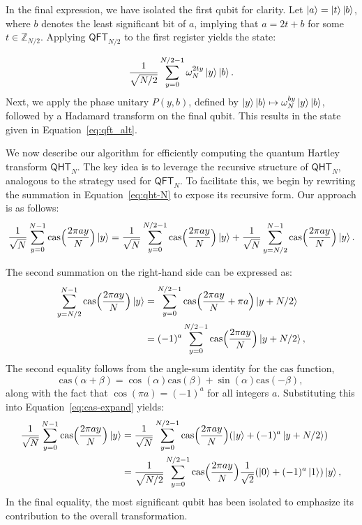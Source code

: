 \documentclass[12pt]{report}
\newcommand{\cas}{\mathrm{cas}}
\newcommand{\qht}{\mathsf{QHT}}
\newcommand{\qft}{\mathsf{QFT}}
\begin{document}
In the final expression, we have isolated the first qubit for clarity. Let \( \ket{a} = \ket{t}\ket{b} \), where \( b \) denotes the least significant bit of \( a \), implying that \( a = 2t + b \) for some \( t \in \mathbb{Z}_{N / 2} \). Applying \( \qft_{N / 2} \) to the first register yields the state:

\[ \frac{1}{\sqrt{N / 2}} \sum_{y = 0}^{N / 2 - 1} \omega_N^{2ty} \ket{y} \ket{b}. \]
Next, we apply the phase unitary \( P(y, b) \), defined by \( \ket{y} \ket{b} \mapsto \omega_N^{by} \ket{y} \ket{b} \), followed by a Hadamard transform on the final qubit. This results in the state given in Equation~\eqref{eq:qft_alt}.


We now describe our algorithm for efficiently computing the quantum Hartley transform \( \qht_N \). The key idea is to leverage the recursive structure of \( \qht_N \), analogous to the strategy used for \( \qft_N \). To facilitate this, we begin by rewriting the summation in Equation~\eqref{eq:qht-N} to expose its recursive form. Our approach is as follows:
\begin{equation}
    \label{eq:cas-expand}
	\frac{1}{\sqrt{N}} \sum_{y = 0}^{N - 1} \cas\Big( \frac{2\pi a y}{N} \Big) \ket{y}
    = \frac{1}{\sqrt{N}} \sum_{y = 0}^{N / 2 - 1} \cas\Big( \frac{2\pi a y}{N} \Big) \ket{y} + \frac{1}{\sqrt{N}} \sum_{y = N / 2}^{N - 1} \cas\Big( \frac{2\pi a y}{N} \Big) \ket{y}.
\end{equation}



The second summation on the right-hand side can be expressed as:
\begin{align*}
	\sum_{y = N / 2}^{N - 1} \cas\Big( \frac{2\pi a y}{N} \Big) \ket{y}
    & = \sum_{y = 0}^{N / 2 - 1} \cas\Big( \frac{2\pi a y}{N} + \pi a \Big) \ket{y + N/2} \\
    & = (-1)^a \sum_{y = 0}^{N / 2 - 1} \cas\Big( \frac{2\pi a y}{N} \Big) \ket{y + N/2},
\end{align*}
The second equality follows from the angle-sum identity for the \( \cas \) function,
\[
\cas(\alpha + \beta) = \cos(\alpha)\cas(\beta) + \sin(\alpha)\cas(-\beta),
\]
along with the fact that \( \cos(\pi a) = (-1)^a \) for all integers \( a \). Substituting this into Equation~\eqref{eq:cas-expand} yields:
\begin{align}
	\frac{1}{\sqrt{N}} \sum_{y = 0}^{N - 1} \cas\Big( \frac{2\pi a y}{N} \Big) \ket{y}
    & = \frac{1}{\sqrt{N}} \sum_{y = 0}^{N / 2 - 1} \cas\Big( \frac{2\pi a y}{N} \Big) (\ket{y} + (-1)^a \ket{y + N/2}) \nonumber \\
    & = \frac{1}{\sqrt{N / 2}} \sum_{y = 0}^{N / 2 - 1} \cas\Big( \frac{2\pi a y}{N} \Big) \frac{1}{\sqrt{2}} (\ket{0} + (-1)^a \ket{1}) \ket{y}, \label{eq:qht-alt} 
\end{align}
In the final equality, the most significant qubit has been isolated to emphasize its contribution to the overall transformation.
\end{document}
